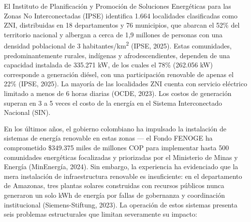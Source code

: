 \documentclass[12pt,letterpaper]{article}
\begin{document}
El Instituto de Planificaci\'on y Promoci\'on de Soluciones Energ\'eticas para las Zonas No Interconectadas (IPSE) identifica 1.664 localidades clasificadas como ZNI, distribuidas en 18 departamentos y 76 municipios, que abarcan el 52\% del territorio nacional y albergan a cerca de 1,9 millones de personas con una densidad poblacional de 3 habitantes/km\textsuperscript{2} (IPSE, 2025). Estas comunidades, predominantemente rurales, ind\'igenas y afrodescendientes, dependen de una capacidad instalada de 335.271 kW, de los cuales el 78\% (262.056 kW) corresponde a generaci\'on di\'esel, con una participaci\'on renovable de apenas el 22\% (IPSE, 2025). La mayor\'ia de las localidades ZNI cuenta con servicio el\'ectrico limitado a menos de 6 horas diarias (OCDE, 2023). Los costos de generaci\'on superan en 3 a 5 veces el costo de la energ\'ia en el Sistema Interconectado Nacional (SIN).

En los \'ultimos a\~nos, el gobierno colombiano ha impulsado la instalaci\'on de sistemas de energ\'ia renovable en estas zonas --- el Fondo FENOGE ha comprometido \$349.375 miles de millones COP para implementar hasta 500 comunidades energ\'eticas focalizadas y priorizadas por el Ministerio de Minas y Energ\'ia (MinEnerg\'ia, 2024). Sin embargo, la experiencia ha evidenciado que la mera instalaci\'on de infraestructura renovable es insuficiente: en el departamento de Amazonas, tres plantas solares construidas con recursos p\'ublicos nunca generaron un solo kWh de energ\'ia por fallas de gobernanza y coordinaci\'on institucional (Siemens-Stiftung, 2023). La operaci\'on de estos sistemas presenta seis problemas estructurales que limitan severamente su impacto:
\end{document}
